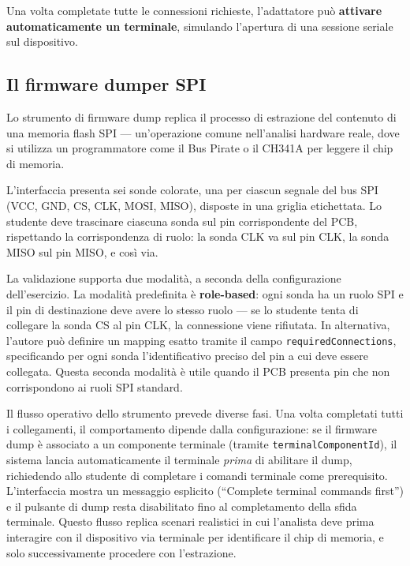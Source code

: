 Una volta completate tutte le connessioni richieste, l'adattatore può \textbf{attivare automaticamente un terminale}, simulando l'apertura di una sessione seriale sul dispositivo.


\subsection{Il firmware dumper SPI}
\label{subsec:firmware-dumper}

Lo strumento di firmware dump replica il processo di estrazione del contenuto di una memoria flash SPI --- un'operazione comune nell'analisi hardware reale, dove si utilizza un programmatore come il Bus Pirate o il CH341A per leggere il chip di memoria.

L'interfaccia presenta sei sonde colorate, una per ciascun segnale del bus SPI (VCC, GND, CS, CLK, MOSI, MISO), disposte in una griglia etichettata. Lo studente deve trascinare ciascuna sonda sul pin corrispondente del PCB, rispettando la corrispondenza di ruolo: la sonda CLK va sul pin CLK, la sonda MISO sul pin MISO, e così via.

La validazione supporta due modalità, a seconda della configurazione dell'esercizio. La modalità predefinita è \textbf{role-based}: ogni sonda ha un ruolo SPI e il pin di destinazione deve avere lo stesso ruolo --- se lo studente tenta di collegare la sonda CS al pin CLK, la connessione viene rifiutata. In alternativa, l'autore può definire un mapping esatto tramite il campo \texttt{requiredConnections}, specificando per ogni sonda l'identificativo preciso del pin a cui deve essere collegata. Questa seconda modalità è utile quando il PCB presenta pin che non corrispondono ai ruoli SPI standard.

Il flusso operativo dello strumento prevede diverse fasi. Una volta completati tutti i collegamenti, il comportamento dipende dalla configurazione: se il firmware dump è associato a un componente terminale (tramite \texttt{terminalComponentId}), il sistema lancia automaticamente il terminale \textit{prima} di abilitare il dump, richiedendo allo studente di completare i comandi terminale come prerequisito. L'interfaccia mostra un messaggio esplicito (``Complete terminal commands first'') e il pulsante di dump resta disabilitato fino al completamento della sfida terminale. Questo flusso replica scenari realistici in cui l'analista deve prima interagire con il dispositivo via terminale per identificare il chip di memoria, e solo successivamente procedere con l'estrazione.

